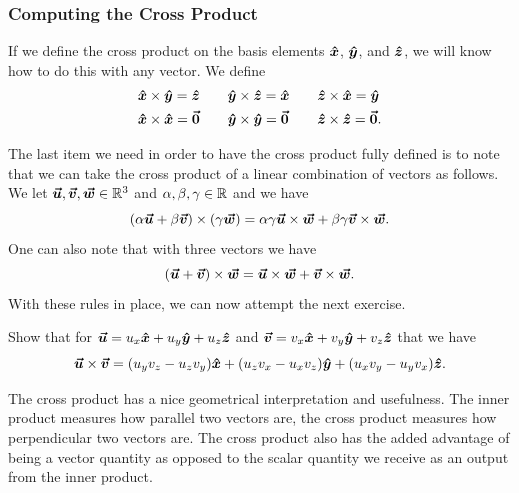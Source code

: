         \subsubsection{Computing the Cross Product}
        If we define the cross product on the basis elements $\xhat$, $\yhat$, and $\zhat$, we will know how to do this with any vector.  We define
        \begin{align*}
            &\xhat\times \yhat = \zhat &\quad &\yhat\times \zhat = \xhat &\quad
            &\zhat\times \xhat = \yhat\\
            &\xhat\times \xhat = \zerovec &\quad
            &\yhat\times \yhat = \zerovec &\quad
            &\zhat\times \zhat = \zerovec.
        \end{align*}
        
        The last item we need in order to have the cross product fully defined is to note that we can take the cross product of a linear combination of vectors as follows. We let $\vecu,\vecv,\vecw \in \R^3$ and $\alpha,\beta,\gamma \in \R$ and we have
        \[
        (\alpha \vecu + \beta \vecv)\times (\gamma \vecw) = \alpha \gamma \vecu \times \vecw + \beta \gamma  \vecv \times \vecw.
        \]
        One can also note that with three vectors we have
        \[
        (\vecu + \vecv)\times \vecw = \vecu \times \vecw + \vecv \times \vecw.
        \]
        With these rules in place, we can now attempt the next exercise.
        
        \begin{exercise}
        Show that for $\vecu = u_x \xhat + u_y\yhat + u_z \zhat$ and $\vecv = v_x \xhat + v_y \yhat + v_z\zhat$ that we have
        \[
        \vecu\times \vecv = (u_yv_z-u_zv_y)\xhat + (u_zv_x-u_xv_z)\yhat+ (u_xv_y - u_yv_x)\zhat.
        \]
        \end{exercise}
        
        The cross product has a nice geometrical interpretation and usefulness.  The inner product measures how parallel two vectors are, the cross product measures how perpendicular two vectors are.  The cross product also has the added advantage of being a vector quantity as opposed to the scalar quantity we receive as an output from the inner product.
        
